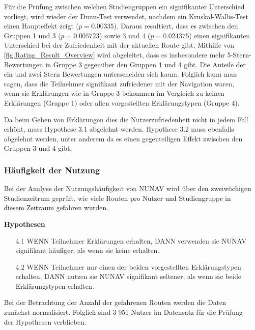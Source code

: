Für die Prüfung zwischen welchen Studiengruppen ein signifikanter Unterschied vorliegt, wird wieder der Dunn-Test \cite{dunn1964multiple} verwendet, nachdem ein Kruskal-Wallis-Test einen Haupteffekt zeigt ($ p = 0.00335 $). Daraus resultiert, dass es zwischen den Gruppen 1 und 3 ($ p = 0.005723$) sowie 3 und 4 ($ p = 0.024375 $) einen signifikanten Unterschied bei der Zufriedenheit mit der aktuellen Route gibt. Mithilfe von \autoref{fig:Rating_Result_Overview} wird abgeleitet, dass es insbesondere mehr 5-Stern-Bewertungen in Gruppe 3 gegenüber den Gruppen 1 und 4 gibt. Die Anteile der ein und zwei Stern Bewertungen unterscheiden sich kaum. Folglich kann man sagen, dass die Teilnehmer signifikant zufriedener mit der Navigation waren, wenn sie Erklärungen wie in Gruppe 3 bekommen im Vergleich zu keinen Erklärungen (Gruppe 1) oder allen vorgestellten Erklärungstypen (Gruppe 4).

Da beim Geben von Erklärungen dies die Nutzerzufriedenheit nicht in jedem Fall erhöht, muss Hypothese 3.1 abgelehnt werden. Hypothese 3.2 muss ebenfalls abgelehnt werden, unter anderem da es einen gegenteiligen Effekt zwischen den Gruppen 3 und 4 gibt.

\subsubsection{Häufigkeit der Nutzung}
\label{sec:06_model_evaluation:usage_analysis}

Bei der Analyse der Nutzungshäufigkeit von NUNAV wird über den zweiwöchigen Studienzeitrum geprüft, wie viele Routen pro Nutzer und Studiengruppe in diesem Zeitraum gefahren wurden.

\textbf{Hypothesen}

\begin{enumerate}
    \item[4.1] WENN Teilnehmer Erklärungen erhalten, DANN verwenden sie NUNAV signifikant häufiger, als wenn sie keine erhalten.
    \item[4.2] WENN Teilnehmer nur einen der beiden vorgestellten Erklärungstypen erhalten, DANN nutzen sie NUNAV signifikant seltener, als wenn sie beide Erklärungstypen erhalten.
\end{enumerate}

Bei der Betrachtung der Anzahl der gefahrenen Routen werden die Daten zunächst normalisiert. Folglich sind 3 951 Nutzer im Datensatz für die Prüfung der Hypothesen verblieben.

